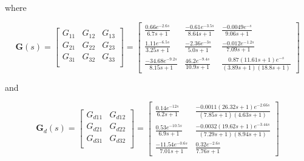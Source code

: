 \documentclass[a4paper,12pt]{article}
\begin{document}
where

\begin{equation}
	\textbf{G}(s) = \begin{bmatrix}
	G_{11} & G_{12} & G_{13} \\
	G_{21} & G_{22} & G_{23} \\
	G_{31} & G_{32} & G_{33} \\
	\end{bmatrix} = \begin{bmatrix}
	\frac{0.66e^{-2.6s}}{6.7s+1} & \frac{-0.61e^{-3.5s}}{8.64s+1} & \frac{-0.0049e^{-s}}{9.06s+1} \\
	\frac{1.11e^{-6.5s}}{3.25s+1} & \frac{-2.36e^{-3s}}{5.0s+1} & \frac{-0.012e^{-1.2s}}{7.09s+1} \\
	\frac{-34.68e^{-9.2s}}{8.15s+1} & \frac{46.2e^{-9.4s}}{10.9s+1} & \frac{0.87(11.61s+1)e^{-s}}{(3.89s+1)(18.8s+1)}
	\end{bmatrix}
\end{equation}

and

\begin{equation}
\textbf{G}_{d}(s) = \begin{bmatrix}
G_{d11} & G_{d12} \\
G_{d21} & G_{d22} \\
G_{d31} & G_{d32} \\
\end{bmatrix} = \begin{bmatrix}
\frac{0.14e^{-12s}}{6.2s+1} & \frac{-0.0011(26.32s+1)e^{-2.66s}}{(7.85s+1)(4.63s+1)} \\
\frac{0.53e^{-10.5s}}{6.9s+1} & \frac{-0.0032(19.62s+1)e^{-3.44s}}{(7.29s+1)(8.94s+1)} \\
\frac{-11.54e^{-0.6s}}{7.01s+1} & \frac{0.32e^{-2.6s}}{7.76s+1}
\end{bmatrix}
\end{equation}


\appendix
\renewcommand{\thefigure}{\thesection.\arabic{figure}}
\renewcommand{\thetable}{\thesection.\arabic{table}}
\renewcommand{\thepage}{\thesection.\arabic{page}}
\end{document}
